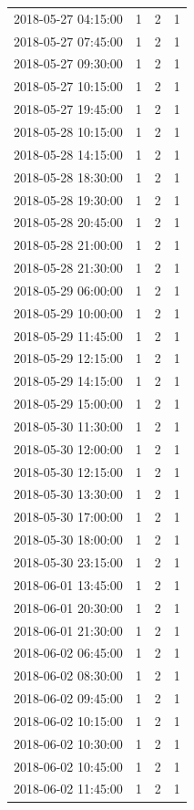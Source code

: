 \begin{tabular}{lrrr}
2018-05-27 04:15:00 & 1 & 2 & 1 \\
2018-05-27 07:45:00 & 1 & 2 & 1 \\
2018-05-27 09:30:00 & 1 & 2 & 1 \\
2018-05-27 10:15:00 & 1 & 2 & 1 \\
2018-05-27 19:45:00 & 1 & 2 & 1 \\
2018-05-28 10:15:00 & 1 & 2 & 1 \\
2018-05-28 14:15:00 & 1 & 2 & 1 \\
2018-05-28 18:30:00 & 1 & 2 & 1 \\
2018-05-28 19:30:00 & 1 & 2 & 1 \\
2018-05-28 20:45:00 & 1 & 2 & 1 \\
2018-05-28 21:00:00 & 1 & 2 & 1 \\
2018-05-28 21:30:00 & 1 & 2 & 1 \\
2018-05-29 06:00:00 & 1 & 2 & 1 \\
2018-05-29 10:00:00 & 1 & 2 & 1 \\
2018-05-29 11:45:00 & 1 & 2 & 1 \\
2018-05-29 12:15:00 & 1 & 2 & 1 \\
2018-05-29 14:15:00 & 1 & 2 & 1 \\
2018-05-29 15:00:00 & 1 & 2 & 1 \\
2018-05-30 11:30:00 & 1 & 2 & 1 \\
2018-05-30 12:00:00 & 1 & 2 & 1 \\
2018-05-30 12:15:00 & 1 & 2 & 1 \\
2018-05-30 13:30:00 & 1 & 2 & 1 \\
2018-05-30 17:00:00 & 1 & 2 & 1 \\
2018-05-30 18:00:00 & 1 & 2 & 1 \\
2018-05-30 23:15:00 & 1 & 2 & 1 \\
2018-06-01 13:45:00 & 1 & 2 & 1 \\
2018-06-01 20:30:00 & 1 & 2 & 1 \\
2018-06-01 21:30:00 & 1 & 2 & 1 \\
2018-06-02 06:45:00 & 1 & 2 & 1 \\
2018-06-02 08:30:00 & 1 & 2 & 1 \\
2018-06-02 09:45:00 & 1 & 2 & 1 \\
2018-06-02 10:15:00 & 1 & 2 & 1 \\
2018-06-02 10:30:00 & 1 & 2 & 1 \\
2018-06-02 10:45:00 & 1 & 2 & 1 \\
2018-06-02 11:45:00 & 1 & 2 & 1 \\

\end{tabular}
